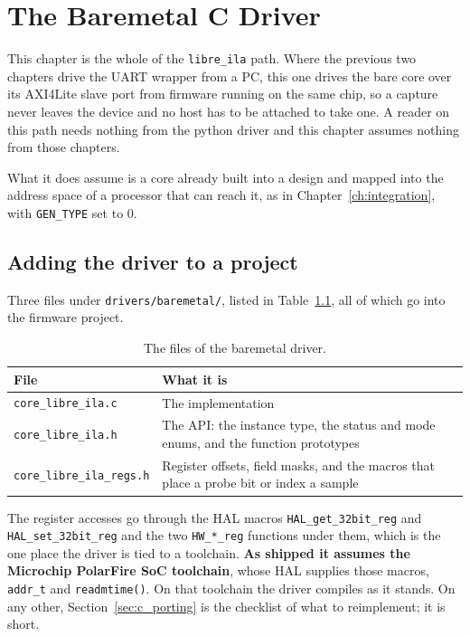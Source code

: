 \documentclass[../manual.tex]{subfiles}
\begin{document}
\chapter{The Baremetal C Driver}
\label{ch:cdriver}

This chapter is the whole of the \texttt{libre\_ila} path. Where the previous two chapters drive the UART wrapper from a PC, this one drives the bare core over its AXI4Lite slave port from firmware running on the same chip, so a capture never leaves the device and no host has to be attached to take one. A reader on this path needs nothing from the python driver and this chapter assumes nothing from those chapters.

What it does assume is a core already built into a design and mapped into the address space of a processor that can reach it, as in Chapter~\ref{ch:integration}, with \texttt{GEN\_TYPE} set to 0.

\section{Adding the driver to a project}
\label{sec:c_files}

Three files under \texttt{drivers/baremetal/}, listed in Table~\ref{tab:c_files}, all of which go into the firmware project.

\begin{table}[H]
    \centering
    \begin{tabularx}{\textwidth}{|l|X|}
        \hline
        \rowcolor{gray!40} \textbf{File} & \textbf{What it is} \\
        \hline
        \texttt{core\_libre\_ila.c} & The implementation \\
        \hline
        \texttt{core\_libre\_ila.h} & The API: the instance type, the status and mode enums, and the function prototypes \\
        \hline
        \texttt{core\_libre\_ila\_regs.h} & Register offsets, field masks, and the macros that place a probe bit or index a sample \\
        \hline
    \end{tabularx}
    \caption{The files of the baremetal driver.}
    \label{tab:c_files}
\end{table}

The register accesses go through the HAL macros \texttt{HAL\_get\_32bit\_reg} and \texttt{HAL\_set\_32bit\_reg} and the two \texttt{HW\_*\_reg} functions under them, which is the one place the driver is tied to a toolchain. \textbf{As shipped it assumes the Microchip PolarFire SoC toolchain}, whose HAL supplies those macros, \texttt{addr\_t} and \texttt{readmtime()}. On that toolchain the driver compiles as it stands. On any other, Section~\ref{sec:c_porting} is the checklist of what to reimplement; it is short.
\end{document}
